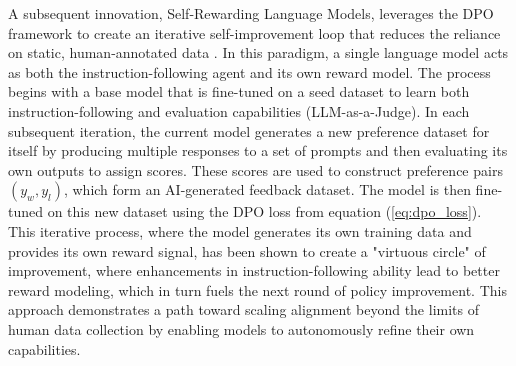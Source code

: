 A subsequent innovation, Self-Rewarding Language Models, leverages the DPO framework to create an iterative self-improvement loop that reduces the reliance on static, human-annotated data \citep{yuan2024self}. In this paradigm, a single language model acts as both the instruction-following agent and its own reward model. The process begins with a base model that is fine-tuned on a seed dataset to learn both instruction-following and evaluation capabilities (LLM-as-a-Judge). In each subsequent iteration, the current model generates a new preference dataset for itself by producing multiple responses to a set of prompts and then evaluating its own outputs to assign scores. These scores are used to construct preference pairs $(y_w, y_l)$, which form an AI-generated feedback dataset. The model is then fine-tuned on this new dataset using the DPO loss from equation (\ref{eq:dpo_loss}). This iterative process, where the model generates its own training data and provides its own reward signal, has been shown to create a "virtuous circle" of improvement, where enhancements in instruction-following ability lead to better reward modeling, which in turn fuels the next round of policy improvement. This approach demonstrates a path toward scaling alignment beyond the limits of human data collection by enabling models to autonomously refine their own capabilities.